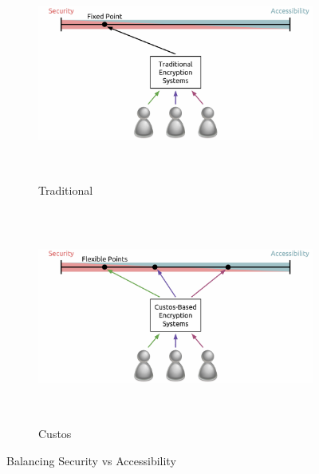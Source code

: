 \begin{figure}[!tb]
  \vspace{5ex}
  \begin{center}
    \begin{subfigure}{\textwidth}
      \begin{center}
        \includegraphics[height=200pt]
                        {./figs/pdf/SecuityToAccessibility-Traditional.pdf}
        \caption{Traditional}
        \label{fig:SvA-traditional}
      \end{center}
    \end{subfigure}
    \begin{subfigure}{\textwidth}
      \begin{center}
        \includegraphics[height=200pt]
                        {./figs/pdf/SecuityToAccessibility-Custos.pdf}
        \caption{Custos}
        \label{fig:SvA-custos}
      \end{center}
    \end{subfigure}
  \end{center}
  \caption{Balancing Security vs Accessibility}
  \label{fig:SvA}
\end{figure}

